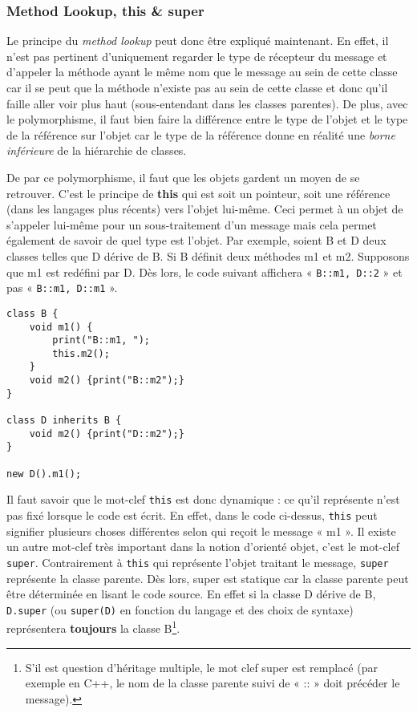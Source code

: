 \documentclass{article}
\begin{document}
		\subsubsection{Method Lookup, this \& super}
			Le principe du \textit{method lookup} peut donc être expliqué maintenant. En effet, il n'est pas pertinent d'uniquement regarder le type de récepteur du message et d'appeler
			la méthode ayant le même nom que le message au sein de cette classe car il se peut que la méthode n'existe pas au sein de cette classe et donc qu'il faille aller voir plus haut
			(sous-entendant dans les classes parentes). De plus, avec le polymorphisme, il faut bien faire la différence entre le type de l'objet et le type de la référence sur l'objet
			car le type de la référence donne en réalité une \textit{borne inférieure} de la hiérarchie de classes.

			De par ce polymorphisme, il faut que les objets gardent un moyen de se retrouver. C'est le principe de \textbf{this} qui est soit un pointeur, soit une référence (dans les langages
			plus récents) vers l'objet lui-même. Ceci permet à un objet de s'appeler lui-même pour un sous-traitement d'un message mais cela permet également de savoir de quel type est l'objet.
			Par exemple, soient B et D deux classes telles que D dérive de B. Si B définit deux méthodes m1 et m2. Supposons que m1 est redéfini par D. Dès lors, le code suivant affichera
			« \texttt{B::m1, D::2} » et pas « \texttt{B::m1, D::m1} ».

\begin{verbatim}
class B {
    void m1() {
        print("B::m1, ");
        this.m2();
    }
    void m2() {print("B::m2");}
}

class D inherits B {
    void m2() {print("D::m2");}
}

new D().m1();
\end{verbatim}

			Il faut savoir que le mot-clef \texttt{this} est donc dynamique : ce qu'il représente n'est pas fixé lorsque le code est écrit. En effet, dans le code ci-dessus, \texttt{this} peut
			signifier plusieurs choses différentes selon qui reçoit le message « m1 ». Il existe un autre mot-clef très important dans la notion d'orienté objet, c'est le mot-clef \texttt{super}.
			Contrairement à \texttt{this} qui représente l'objet traitant le message, \texttt{super} représente la classe parente. Dès lors, super est statique car la classe parente peut être
			déterminée en lisant le code source. En effet si la classe D dérive de B, \texttt{D.super} (ou \texttt{super(D)} en fonction du langage et des choix de syntaxe) représentera
			\textbf{toujours} la classe B\footnote{S'il est question d'héritage multiple, le mot clef super est remplacé (par exemple en C++, le nom de la classe parente suivi de « :: » doit
			précéder le message).}.
\end{document}

